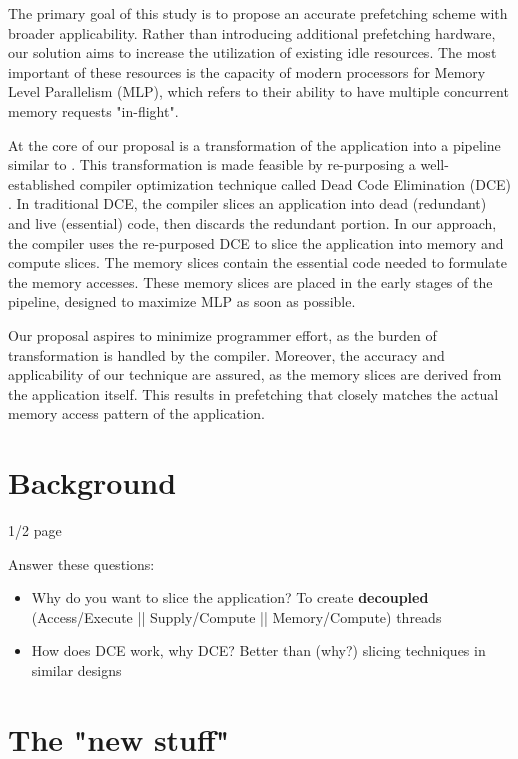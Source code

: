 \documentclass{acaces}
\begin{document}
The primary goal of this study is to propose an accurate prefetching scheme with broader applicability.
Rather than introducing additional prefetching hardware, our solution aims to increase the utilization of existing idle resources.
The most important of these resources is the capacity of modern processors for Memory Level Parallelism (MLP),
which refers to their ability to have multiple concurrent memory requests "in-flight".

At the core of our proposal is a transformation of the application into a pipeline similar to \cite{ham_desc_2015, manocha_graphattack_2021, nguyen_phloem_2023}.
This transformation is made feasible by re-purposing a well-established compiler optimization technique called Dead Code Elimination (DCE) \cite{cytron_efficiently_1991}.
In traditional DCE, the compiler slices an application into dead (redundant) and live (essential) code, then discards the redundant portion.
In our approach, the compiler uses the re-purposed DCE to slice the application into memory and compute slices.
The memory slices contain the essential code needed to formulate the memory accesses.
These memory slices are placed in the early stages of the pipeline, designed to maximize MLP as soon as possible.

Our proposal aspires to minimize programmer effort, as the burden of transformation is handled by the compiler.
Moreover, the accuracy and applicability of our technique are assured, as the memory slices are derived from the application itself.
This results in prefetching that closely matches the actual memory access pattern of the application.

\section{Background}

1/2 page

Answer these questions:
\begin{itemize}
\item Why do you want to slice the application?
      To create \textbf{decoupled} (Access/Execute || Supply/Compute || Memory/Compute) threads
\item How does DCE work, why DCE?
      Better than (why?) slicing techniques in similar designs \cite{ham_desc_2015}
\end{itemize}

\section{The "new stuff"} 
\end{document}
